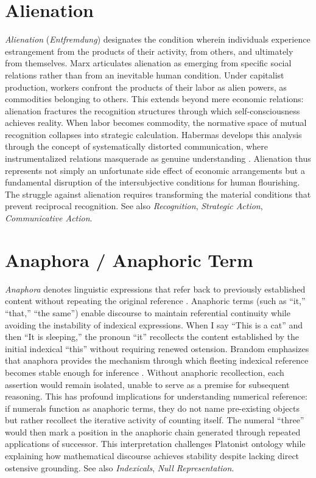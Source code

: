 \documentclass{book}
\begin{document}
\section{Alienation}

\textit{Alienation} (\textit{Entfremdung}) designates the condition wherein individuals experience estrangement from the products of their activity, from others, and ultimately from themselves. Marx articulates alienation as emerging from specific social relations rather than from an inevitable human condition. Under capitalist production, workers confront the products of their labor as alien powers, as commodities belonging to others. This extends beyond mere economic relations: alienation fractures the recognition structures through which self-consciousness achieves reality. When labor becomes commodity, the normative space of mutual recognition collapses into strategic calculation. Habermas develops this analysis through the concept of systematically distorted communication, where instrumentalized relations masquerade as genuine understanding \parencite{habermas1992individuation}. Alienation thus represents not simply an unfortunate side effect of economic arrangements but a fundamental disruption of the intersubjective conditions for human flourishing. The struggle against alienation requires transforming the material conditions that prevent reciprocal recognition. See also \textit{Recognition}, \textit{Strategic Action}, \textit{Communicative Action}.

\section{Anaphora / Anaphoric Term}

\textit{Anaphora} denotes linguistic expressions that refer back to previously established content without repeating the original reference \parencite{brandom1994making}. Anaphoric terms (such as ``it,'' ``that,'' ``the same'') enable discourse to maintain referential continuity while avoiding the instability of indexical expressions. When I say ``This is a cat'' and then ``It is sleeping,'' the pronoun ``it'' recollects the content established by the initial indexical ``this'' without requiring renewed ostension. Brandom emphasizes that anaphora provides the mechanism through which fleeting indexical reference becomes stable enough for inference \parencite{brandom1994making}. Without anaphoric recollection, each assertion would remain isolated, unable to serve as a premise for subsequent reasoning. This has profound implications for understanding numerical reference: if numerals function as anaphoric terms, they do not name pre-existing objects but rather recollect the iterative activity of counting itself. The numeral ``three'' would then mark a position in the anaphoric chain generated through repeated applications of successor. This interpretation challenges Platonist ontology while explaining how mathematical discourse achieves stability despite lacking direct ostensive grounding. See also \textit{Indexicals}, \textit{Null Representation}.
\end{document}
